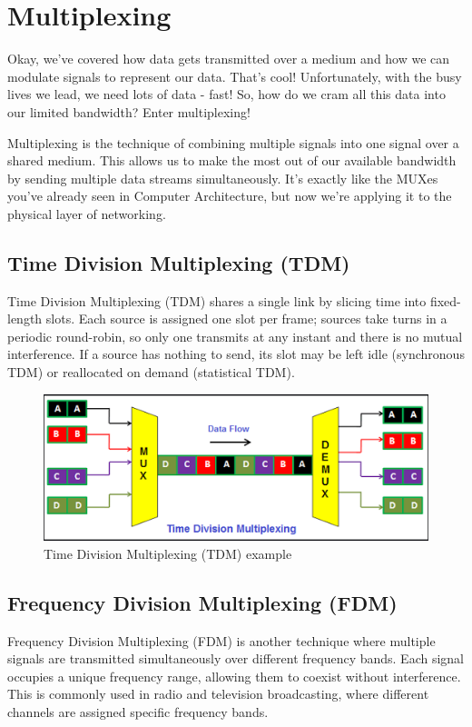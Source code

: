 \newpage
\section{Multiplexing}\label{sec:multiplexing}
Okay, we've covered how data gets transmitted over a medium and how we can modulate signals to represent our data. That's cool! Unfortunately, with the busy lives we lead, we need lots of data - fast! So, how do we cram all this data into our limited bandwidth? Enter multiplexing!

Multiplexing is the technique of combining multiple signals into one signal over a shared medium. This allows us to make the most out of our available bandwidth by sending multiple data streams simultaneously. It's exactly like the MUXes you've already seen in Computer Architecture, but now we're applying it to the physical layer of networking.

\subsection{Time Division Multiplexing (TDM)}
\label{subsec:tdm}
Time Division Multiplexing (TDM) shares a single link by slicing time into fixed-length slots. Each source is assigned one slot per frame; sources take turns in a periodic round-robin, so only one transmits at any instant and there is no mutual interference. If a source has nothing to send, its slot may be left idle (synchronous TDM) or reallocated on demand (statistical TDM).

\begin{figure}[h]
    \centering
    \includegraphics[width=.8\textwidth]{assets/osi/physical/multiplexing/tdm.png}
    \caption{Time Division Multiplexing (TDM) example}
    \label{fig:tdm_example}
\end{figure}

\subsection{Frequency Division Multiplexing (FDM)}
\label{subsec:fdm}
Frequency Division Multiplexing (FDM) is another technique where multiple signals are transmitted simultaneously over different frequency bands. Each signal occupies a unique frequency range, allowing them to coexist without interference. This
is commonly used in radio and television broadcasting, where different channels are assigned specific frequency bands.


